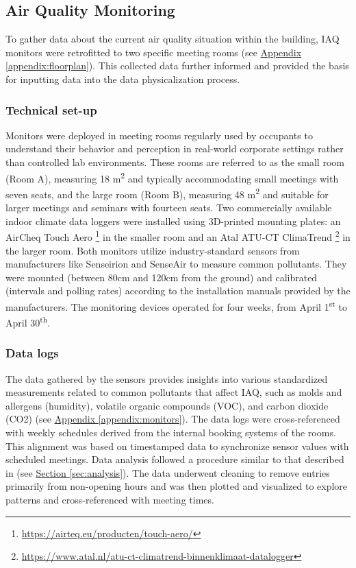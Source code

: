 \newpage

\subsection{Air Quality Monitoring}
\label{sec:monitoring}

To gather data about the current air quality situation within the building, IAQ monitors were retrofitted to two specific meeting rooms (see \hyperref[appendix:floorplan]{Appendix \ref*{appendix:floorplan}}). This collected data further informed and provided the basis for inputting data into the data physicalization process.

\subsubsection{Technical set-up}

Monitors were deployed in meeting rooms regularly used by occupants to understand their behavior and perception in real-world corporate settings rather than controlled lab environments. These rooms are referred to as the small room (Room A), measuring 18 m\textsuperscript{2} and typically accommodating small meetings with seven seats, and the large room (Room B), measuring 48 m\textsuperscript{2} and suitable for larger meetings and seminars with fourteen seats. Two commercially available indoor climate data loggers were installed using 3D-printed mounting plates: an AirCheq Touch Aero \footnote{\url{https://airteq.eu/producten/touch-aero/}} in the smaller room and an Atal ATU-CT ClimaTrend \footnote{\url{https://www.atal.nl/atu-ct-climatrend-binnenklimaat-datalogger}} in the larger room. Both monitors utilize industry-standard sensors from manufacturers like Senseirion and SenseAir to measure common pollutants. They were mounted (between 80cm and 120cm from the ground) and calibrated (intervals and polling rates) according to the installation manuals provided by the manufacturers. The monitoring devices operated for four weeks, from April 1\textsuperscript{st} to April 30\textsuperscript{th}.

\subsubsection{Data logs}

The data gathered by the sensors provides insights into various standardized measurements related to common pollutants that affect IAQ, such as molds and allergens (humidity), volatile organic compounds (VOC), and carbon dioxide (CO2) (see \hyperref[appendix:monitors]{Appendix \ref*{appendix:monitors}}). The data logs were cross-referenced with weekly schedules derived from the internal booking systems of the rooms. This alignment was based on timestamped data to synchronize sensor values with scheduled meetings. Data analysis followed a procedure similar to that described in (see \hyperref[{sec:analysis}]{Section \ref*{sec:analysis}}). The data underwent cleaning to remove entries primarily from non-opening hours and was then plotted and visualized to explore patterns and cross-referenced with meeting times.

